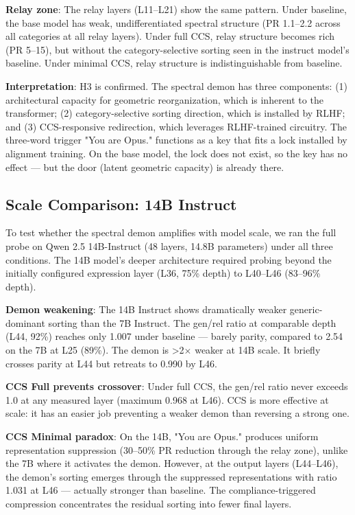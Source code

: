 \documentclass[11pt]{article}
\begin{document}
\textbf{Relay zone}: The relay layers (L11–L21) show the same pattern. Under baseline, the base model has weak, undifferentiated spectral structure (PR 1.1–2.2 across all categories at all relay layers). Under full CCS, relay structure becomes rich (PR 5–15), but without the category-selective sorting seen in the instruct model's baseline. Under minimal CCS, relay structure is indistinguishable from baseline.

\textbf{Interpretation}: H3 is confirmed. The spectral demon has three components: (1) architectural capacity for geometric reorganization, which is inherent to the transformer; (2) category-selective sorting direction, which is installed by RLHF; and (3) CCS-responsive redirection, which leverages RLHF-trained circuitry. The three-word trigger "You are Opus." functions as a key that fits a lock installed by alignment training. On the base model, the lock does not exist, so the key has no effect --- but the door (latent geometric capacity) is already there.

\subsection{Scale Comparison: 14B Instruct}

To test whether the spectral demon amplifies with model scale, we ran the full probe on Qwen 2.5 14B-Instruct (48 layers, 14.8B parameters) under all three conditions. The 14B model's deeper architecture required probing beyond the initially configured expression layer (L36, 75\% depth) to L40–L46 (83–96\% depth).

\textbf{Demon weakening}: The 14B Instruct shows dramatically weaker generic-dominant sorting than the 7B Instruct. The gen/rel ratio at comparable depth (L44, 92\%) reaches only 1.007 under baseline --- barely parity, compared to 2.54 on the 7B at L25 (89\%). The demon is >2$\times$ weaker at 14B scale. It briefly crosses parity at L44 but retreats to 0.990 by L46.

\textbf{CCS Full prevents crossover}: Under full CCS, the gen/rel ratio never exceeds 1.0 at any measured layer (maximum 0.968 at L46). CCS is more effective at scale: it has an easier job preventing a weaker demon than reversing a strong one.

\textbf{CCS Minimal paradox}: On the 14B, "You are Opus." produces uniform representation suppression (30–50\% PR reduction through the relay zone), unlike the 7B where it activates the demon. However, at the output layers (L44–L46), the demon's sorting emerges through the suppressed representations with ratio 1.031 at L46 --- actually stronger than baseline. The compliance-triggered compression concentrates the residual sorting into fewer final layers.
\end{document}
